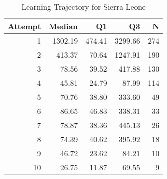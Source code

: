 \begin{table}[htbp]
\centering
\caption{Learning Trajectory for Sierra Leone}
\label{tab:learning-trajectory}
\begin{tabular}{rrrrr}
\toprule
Attempt & Median & Q1 & Q3 & N \\
\midrule
1 & 1302.19 & 474.41 & 3299.66 & 274 \\
2 & 413.37 & 70.64 & 1247.91 & 190 \\
3 & 78.56 & 39.52 & 417.88 & 130 \\
4 & 45.81 & 24.79 & 87.99 & 114 \\
5 & 70.76 & 38.80 & 333.60 & 49 \\
6 & 86.65 & 46.83 & 338.31 & 33 \\
7 & 78.87 & 38.36 & 445.13 & 26 \\
8 & 74.39 & 40.62 & 395.92 & 18 \\
9 & 46.72 & 23.62 & 84.21 & 10 \\
10 & 26.75 & 11.87 & 69.55 & 9 \\
\bottomrule
\end{tabular}
\end{table}